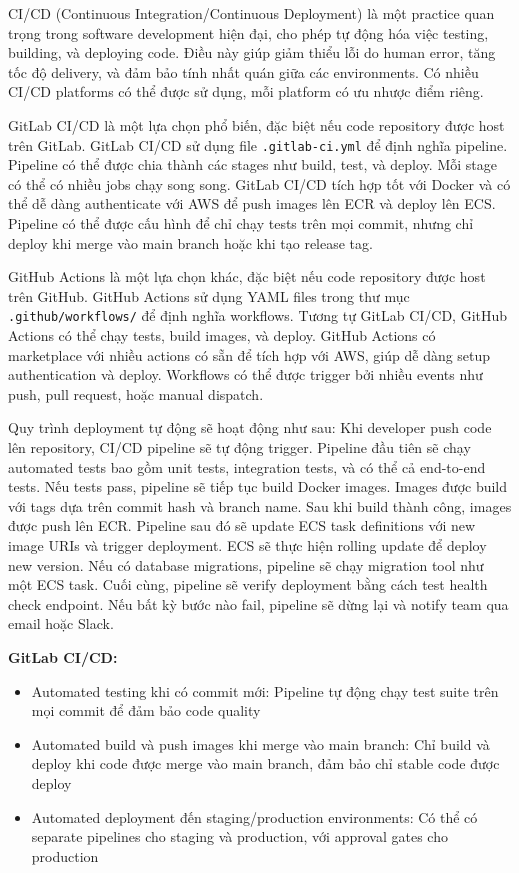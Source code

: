 CI/CD (Continuous Integration/Continuous Deployment) là một practice quan trọng trong software development hiện đại, cho phép tự động hóa việc testing, building, và deploying code. Điều này giúp giảm thiểu lỗi do human error, tăng tốc độ delivery, và đảm bảo tính nhất quán giữa các environments. Có nhiều CI/CD platforms có thể được sử dụng, mỗi platform có ưu nhược điểm riêng.

GitLab CI/CD là một lựa chọn phổ biến, đặc biệt nếu code repository được host trên GitLab. GitLab CI/CD sử dụng file \texttt{.gitlab-ci.yml} để định nghĩa pipeline. Pipeline có thể được chia thành các stages như build, test, và deploy. Mỗi stage có thể có nhiều jobs chạy song song. GitLab CI/CD tích hợp tốt với Docker và có thể dễ dàng authenticate với AWS để push images lên ECR và deploy lên ECS. Pipeline có thể được cấu hình để chỉ chạy tests trên mọi commit, nhưng chỉ deploy khi merge vào main branch hoặc khi tạo release tag.

GitHub Actions là một lựa chọn khác, đặc biệt nếu code repository được host trên GitHub. GitHub Actions sử dụng YAML files trong thư mục \texttt{.github/workflows/} để định nghĩa workflows. Tương tự GitLab CI/CD, GitHub Actions có thể chạy tests, build images, và deploy. GitHub Actions có marketplace với nhiều actions có sẵn để tích hợp với AWS, giúp dễ dàng setup authentication và deploy. Workflows có thể được trigger bởi nhiều events như push, pull request, hoặc manual dispatch.

Quy trình deployment tự động sẽ hoạt động như sau: Khi developer push code lên repository, CI/CD pipeline sẽ tự động trigger. Pipeline đầu tiên sẽ chạy automated tests bao gồm unit tests, integration tests, và có thể cả end-to-end tests. Nếu tests pass, pipeline sẽ tiếp tục build Docker images. Images được build với tags dựa trên commit hash và branch name. Sau khi build thành công, images được push lên ECR. Pipeline sau đó sẽ update ECS task definitions với new image URIs và trigger deployment. ECS sẽ thực hiện rolling update để deploy new version. Nếu có database migrations, pipeline sẽ chạy migration tool như một ECS task. Cuối cùng, pipeline sẽ verify deployment bằng cách test health check endpoint. Nếu bất kỳ bước nào fail, pipeline sẽ dừng lại và notify team qua email hoặc Slack.

\textbf{GitLab CI/CD:}
\begin{itemize}
    \item Automated testing khi có commit mới: Pipeline tự động chạy test suite trên mọi commit để đảm bảo code quality
    \item Automated build và push images khi merge vào main branch: Chỉ build và deploy khi code được merge vào main branch, đảm bảo chỉ stable code được deploy
    \item Automated deployment đến staging/production environments: Có thể có separate pipelines cho staging và production, với approval gates cho production
\end{itemize}

